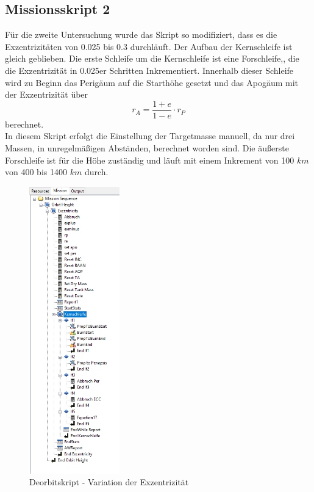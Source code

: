 
\subsection{Missionsskript 2}

	Für die zweite Untersuchung wurde das Skript so modifiziert, dass es die Exzentrizitäten von 0.025 bis 0.3 durchläuft.
Der Aufbau der Kernschleife ist gleich geblieben. Die erste Schleife um die Kernschleife ist eine Forschleife,, die die Exzentrizität in 0.025er Schritten Inkrementiert. Innerhalb dieser Schleife wird zu Beginn das Perigäum auf die Starthöhe gesetzt und das Apogäum mit der Exzentrizität über
\begin{equation}
r_A = \frac{1+e}{1-e}\cdot r_P
\label{apoapsis}
\end{equation}
berechnet.\\

	In diesem Skript erfolgt die Einstellung der Targetmasse manuell, da nur drei Massen, in unregelmäßigen Abständen, berechnet worden sind. Die äußerste Forschleife ist für die Höhe zuständig und läuft mit einem Inkrement von 100 $km$ von 400 bis 1400 $km$ durch. \newpage
\begin{figure}[!h]
	\centering
		\includegraphics[width=0.35\textwidth]{graphics/GMAT/GMAT_Skript_ECC.PNG}
		\caption{Deorbitskript - Variation der Exzentrizität}
			\label{fig:GMAT_Skript_ECC}
\end{figure}



